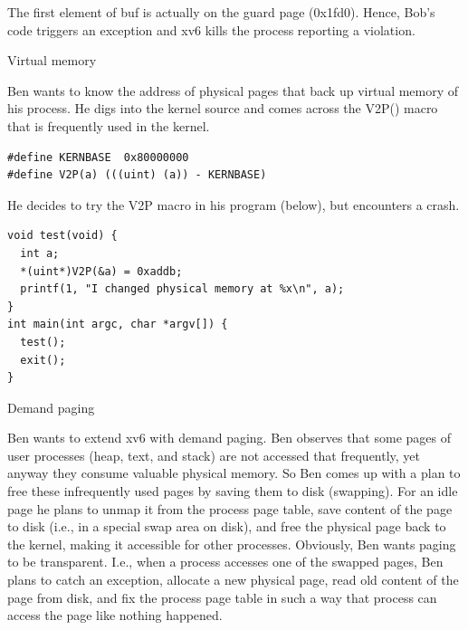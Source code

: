 \documentclass[11pt]{exam}
\def\answers{1}
\begin{document}
\begin{questions}
\begin{parts}
\begin{verbatim}
 \end{verbatim} 

The first element of buf is actually on the guard page (0x1fd0).  Hence, Bob's
code triggers an exception and xv6 kills the process reporting a violation. 

\fi

  \vfill

\end{parts}

\newpage
\addpoints
\question Virtual memory

Ben wants to know the address of physical pages that back up virtual memory of
his process. He digs into the kernel source and comes across the V2P() macro
that is frequently used in the kernel.

\begin{verbatim}
#define KERNBASE  0x80000000 
#define V2P(a) (((uint) (a)) - KERNBASE)
\end{verbatim}

He decides to try the V2P macro in his program (below), but encounters a crash.
\begin{verbatim}
void test(void) {
  int a;
  *(uint*)V2P(&a) = 0xaddb;
  printf(1, "I changed physical memory at %x\n", a);
}
int main(int argc, char *argv[]) {
  test();
  exit();
}
\end{verbatim}


\newpage
\addpoints
\question Demand paging 

Ben wants to extend xv6 with demand paging. Ben observes that some pages of
user processes (heap, text, and stack) are not accessed
that frequently, yet anyway they consume valuable physical memory. So Ben comes
up with a plan to free these infrequently used pages by saving them to disk (swapping). For an idle page he plans to unmap
it from the process page table, save content of the page to disk (i.e., in a special swap area on disk), and free the physical page back to the 
kernel, making it accessible for other processes. Obviously,
Ben wants paging to be transparent. I.e., when a process accesses one of the
swapped pages, Ben plans to catch an exception, allocate a new physical page,
read old content of the page from disk, and fix the process page table in such a
way that process can access the page like nothing happened. 



\end{questions}
\end{document}
